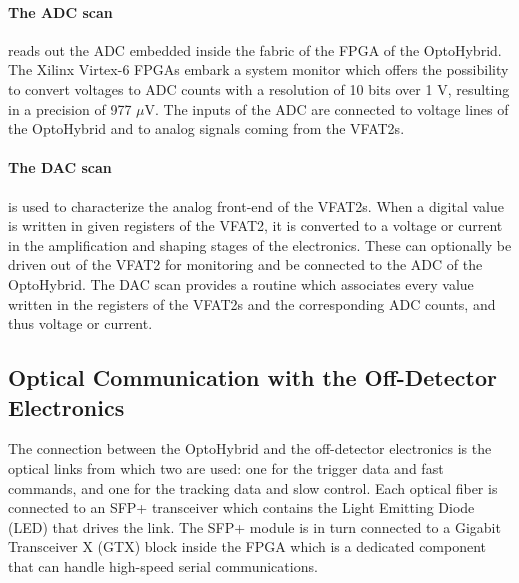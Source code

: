       \paragraph{The ADC scan} reads out the ADC embedded inside the fabric of the FPGA of the OptoHybrid. The Xilinx Virtex-6 FPGAs embark a system monitor \cite{VIRTEX-SYSMON} which offers the possibility to convert voltages to ADC counts with a resolution of 10 bits over 1 V, resulting in a precision of 977 $\mu$V. The inputs of the ADC are connected to voltage lines of the OptoHybrid and to analog signals coming from the VFAT2s.

      \paragraph{The DAC scan} is used to characterize the analog front-end of the VFAT2s. When a digital value is written in given registers of the VFAT2, it is converted to a voltage or current in the amplification and shaping stages of the electronics. These can optionally be driven out of the VFAT2 for monitoring and be connected to the ADC of the OptoHybrid. The DAC scan provides a routine which associates every value written in the registers of the VFAT2s and the corresponding ADC counts, and thus voltage or current.

    \subsection{Optical Communication with the Off-Detector Electronics}

      The connection between the OptoHybrid and the off-detector electronics is the optical links from which two are used: one for the trigger data and fast commands, and one for the tracking data and slow control. Each optical fiber is connected to an SFP+ transceiver which contains the Light Emitting Diode (LED) that drives the link. The SFP+ module is in turn connected to a Gigabit Transceiver X (GTX) block inside the FPGA which is a dedicated component that can handle high-speed serial communications.

